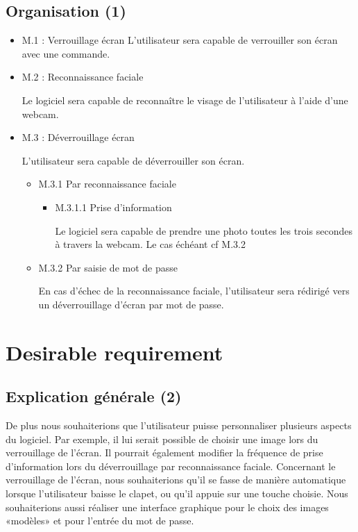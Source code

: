   \subsection{Organisation (1)}
  \begin{itemize}
    \item{M.1 : Verrouillage écran}
    L’utilisateur sera capable de verrouiller son écran avec une commande.
    \\
    \item{M.2 : Reconnaissance faciale}

    Le logiciel sera capable de reconnaître le visage de l’utilisateur à
    l’aide d’une webcam.
    \\
    \item{M.3 : Déverrouillage écran}

    L’utilisateur sera capable de déverrouiller son écran.
    \begin{itemize}
      \item{M.3.1 Par reconnaissance faciale}
      \begin{itemize}
        \item{M.3.1.1 Prise d’information}

        Le logiciel sera capable de prendre une photo toutes les trois
        secondes à travers la webcam.
		    Le cas échéant cf M.3.2
        \end{itemize}
        \vspace{0.5cm}
      \item{M.3.2 Par saisie de mot de passe}

      En cas d’échec de la reconnaissance faciale, l'utilisateur sera rédirigé
      vers un déverrouillage d'écran par mot de passe.
      \end{itemize}
  \end{itemize}

\section{Desirable requirement}
  \subsection{Explication générale (2)}
  De plus nous souhaiterions que l’utilisateur puisse personnaliser plusieurs
  aspects du logiciel. Par exemple, il lui serait possible de choisir une image
  lors du verrouillage de l’écran. Il pourrait également modifier la fréquence
  de prise d’information lors du déverrouillage par reconnaissance faciale.
  Concernant le verrouillage de l’écran, nous souhaiterions qu’il se fasse de
  manière automatique lorsque l’utilisateur baisse le clapet, ou qu’il appuie
  sur une touche choisie.
  Nous souhaiterions aussi réaliser une interface graphique
  pour le choix des images «modèles» et pour l’entrée du mot de passe.

